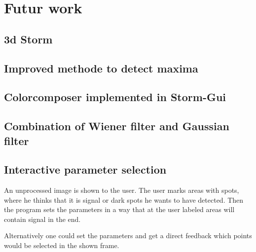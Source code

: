 \chapter{Futur work}
\section{3d Storm}
\section{Improved methode to detect maxima}
\section{Colorcomposer implemented in Storm-Gui}
\section{Combination of Wiener filter and Gaussian filter}
\section{Interactive parameter selection}
An unprocessed image is shown to the user. The user marks areas with spots, where he thinks that it is signal or dark spots he wants to have detected. Then the program sets the parameters in a way that at the user labeled areas will contain signal in the end.

Alternatively one could set the parameters and get a direct feedback which points would be selected in the shown frame.